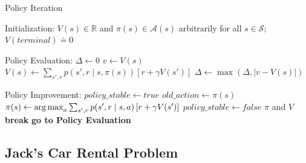 \begin{algorithm}[H]
    \caption{Policy Iteration}
    \begin{algorithmic}
        \State Initialization:
        \State $V(s)\in \mathbb{R}$ and $\pi(s)\in \mathcal{A}(s)$ arbitrarily for all $s\in \mathcal{S}$; $V(terminal) \doteq 0$
        \State
    \end{algorithmic}
    \begin{algorithmic}
        \State Policy Evaluation:
        \Repeat
            \State $\Delta \leftarrow 0$
                \State $v \leftarrow V(s)$
                \State $V(s) \leftarrow \sum_{s',r}p(s',r\mid s,\pi(s))\left[r + \gamma V(s')\right]$
                \State $\Delta \leftarrow \max(\Delta, |v-V(s)|)$
            \EndFor
        \Until{$\Delta < \theta$}
        \State
    \end{algorithmic}
    \begin{algorithmic}
        \State Policy Improvement:
        \State $policy\_stable \leftarrow true$
            \State $old\_action \leftarrow \pi(s)$
            \State $\pi(s) \leftarrow \operatorname*{arg\,max}_a \sum_{s',r}p(s',r\mid s,a)\left[r + \gamma V(s')\right]$
                \State $policy\_stable \leftarrow false$
            \EndIf
        \EndFor
            \Return $\pi$ and $V$
            \State \textbf{break}
        \Else
            \State \textbf{go to Policy Evaluation}
        \EndIf
    \end{algorithmic}
\end{algorithm}

\subsection{Jack's Car Rental Problem}

